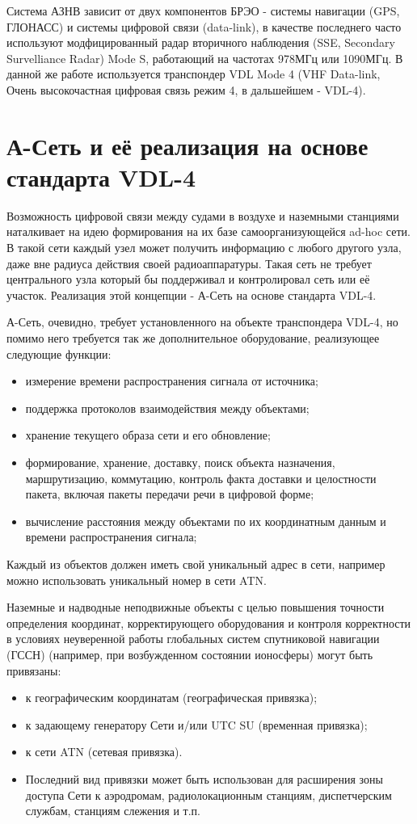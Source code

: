 \documentclass[a4paper,12pt]{report} %
\begin{document}
Система АЗНВ зависит от двух компонентов БРЭО - системы навигации (GPS, ГЛОНАСС)
и системы цифровой связи (data-link), в качестве последнего часто используют
модфицированный радар вторичного наблюдения (SSE, Secondary Survelliance Radar)
Mode S, работающий на частотах 978МГц или 1090МГц. В данной же работе
используется транспондер VDL Mode 4 (VHF Data-link, Очень высокочастная цифровая
связь режим 4, в дальшейшем - VDL-4).
\newpage
\section{А-Сеть и её реализация на основе стандарта VDL-4} %

Возможность цифровой связи между судами в воздухе и наземными станциями
наталкивает на идею формирования на их базе самоорганизующейся ad-hoc сети. В
такой сети каждый узел может получить информацию с любого другого узла, даже вне
радиуса действия своей радиоаппаратуры. Такая сеть не требует центрального узла
который бы поддерживал и контролировал сеть или её участок. Реализация этой
концепции - А-Сеть на основе стандарта VDL-4.

А-Сеть, очевидно, требует установленного на объекте транспондера VDL-4, но
помимо него требуется так же дополнительное оборудование, реализующее следующие
функции:
\begin{itemize}
\item измерение времени распространения сигнала от источника;
\item поддержка протоколов взаимодействия между объектами;
\item хранение текущего образа сети и его обновление;
\item формирование, хранение, доставку, поиск объекта назначения, маршрутизацию,
 коммутацию, контроль факта доставки и целостности пакета, включая пакеты
 передачи речи в цифровой форме;
\item вычисление расстояния между объектами по их координатным данным и времени
  распространения сигнала;
\end{itemize}

Каждый из объектов должен иметь свой уникальный адрес в сети, например можно
использовать уникальный номер в сети ATN.

Наземные и надводные неподвижные объекты с целью повышения точности определения
координат, корректирующего оборудования и контроля корректности в условиях
неуверенной работы глобальных систем спутниковой навигации (ГССН) (например, при
возбужденном состоянии ионосферы) могут быть привязаны:
\begin{itemize}
\item к географическим координатам (географическая привязка);
\item к задающему генератору Сети и/или UTC SU (временная привязка);
\item к сети ATN (сетевая привязка).
\item Последний вид привязки может быть использован для расширения зоны доступа
Сети к аэродромам, радиолокационным станциям, диспетчерским службам, станциям
слежения и т.п.
\end{itemize}
\end{document}
